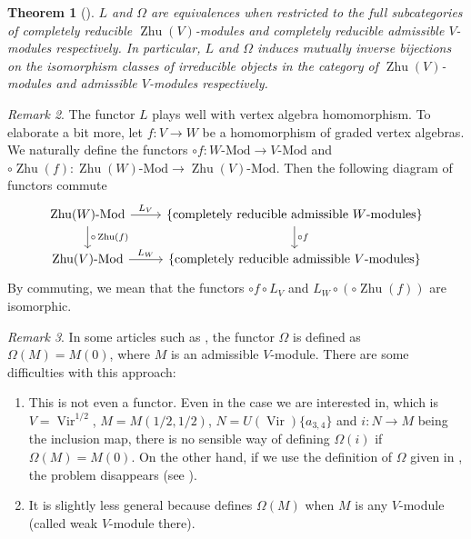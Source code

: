 \documentclass[a4paper, 12pt, reqno]{amsart}
\newtheorem{theorem}{Theorem}[section]
\theoremstyle{remark}
\newtheorem{remark}[theorem]{Remark}
\numberwithin{equation}{subsection}
\DeclareMathOperator{\Vir}{Vir}
\DeclareMathOperator{\Zhu}{Zhu}
\begin{document}
\begin{theorem}[{\cite[Theorem 7.2]{dong_twisted_1998}}]
  \label{thr:39}
  $L$ and $\Omega$ are equivalences when restricted to the full subcategories of completely reducible $\Zhu(V)$-modules and completely reducible admissible $V$-modules respectively.
  In particular, $L$ and $\Omega$ induces mutually inverse bijections on the isomorphism classes of irreducible objects in the category of $\Zhu(V)$-modules and admissible $V$-modules respectively.
\end{theorem}

\begin{remark}
  \label{rmk:32}
  The functor $L$ plays well with vertex algebra homomorphism.
  To elaborate a bit more, let $f: V \to W$ be a homomorphism of graded vertex algebras.
  We naturally define the functors $\circ f: W\text{-Mod} \to V\text{-Mod}$ and $\circ \Zhu(f): \Zhu(W)\text{-Mod} \to \Zhu(V)\text{-Mod}$.
  Then the following diagram of functors commute
  \begin{equation*}
    \begin{tikzcd}
      \Zhu(W)\text{-Mod} \arrow[r, "L_V"] \arrow[d, "\circ \Zhu(f)"] & \{\text{completely reducible admissible $W$-modules}\} \arrow[d, "\circ f"] \\
      \Zhu(V)\text{-Mod} \arrow[r, "L_W"]                           & \{\text{completely reducible admissible $V$-modules}\}
    \end{tikzcd}
  \end{equation*}
  By commuting, we mean that the functors $\circ f \circ L_V$ and $L_W \circ(\circ\Zhu(f))$ are isomorphic.
\end{remark}

\begin{remark}
  \label{rmk:33}
  In some articles such as \cite[\S2]{de_sole_finite_2006}, the functor $\Omega$ is defined as $\Omega(M) = M(0)$, where $M$ is an admissible $V$-module.
  There are some difficulties with this approach:
  \begin{enumerate}
  \item This is not even a functor.
    Even in the case we are interested in, which is $V = \Vir^{1/2}$, $M = M(1/2, 1/2)$, $N = U(\Vir)\{a_{3, 4}\}$ and $i : N \to M$ being the inclusion map, there is no sensible way of defining $\Omega(i)$ if $\Omega(M) = M(0)$.
    On the other hand, if we use the definition of $\Omega$ given in \cite{dong_twisted_1998}, the problem disappears (see ).
  \item It is slightly less general because \cite{dong_twisted_1998} defines $\Omega(M)$ when $M$ is any $V$-module (called weak $V$-module there).
  \end{enumerate}
\end{remark}
\end{document}
